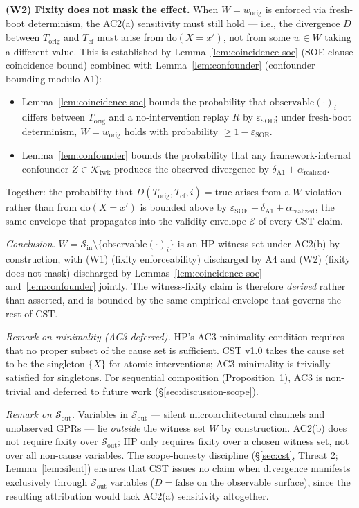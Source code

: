 \documentclass[conference]{IEEEtran}
\newcommand{\Korig}{T_\text{orig}}
\newcommand{\Tcf}{T_\text{cf}}
\newcommand{\Kfwk}{\mathcal{K}_\text{fwk}}
\newcommand{\arealized}{\alpha_\text{realized}}
\newcommand{\dox}[1]{\text{do}(X{=}#1)}
\newcommand{\epsSOE}{\varepsilon_\text{SOE}}
\begin{document}
\textbf{(W2) Fixity does not mask the effect.} When
$W = w_{\text{orig}}$ is enforced via fresh-boot determinism, the
AC2(a) sensitivity must still hold --- i.e., the divergence $D$
between $\Korig$ and $\Tcf$ must arise from $\dox{x'}$, not from
some $w \in W$ taking a different value. This is established by
Lemma~\ref{lem:coincidence-soe} (SOE-clause coincidence bound)
combined with Lemma~\ref{lem:confounder} (confounder bounding
modulo A1):
\begin{itemize}[leftmargin=*]
  \item Lemma~\ref{lem:coincidence-soe} bounds the probability
    that $\text{observable}(\cdot)_i$ differs between $\Korig$
    and a no-intervention replay $R$ by $\epsSOE$; under
    fresh-boot determinism, $W = w_{\text{orig}}$ holds with
    probability $\geq 1 - \epsSOE$.
  \item Lemma~\ref{lem:confounder} bounds the probability that
    any framework-internal confounder $Z \in \Kfwk$ produces the
    observed divergence by $\delta_{\text{A1}} + \arealized$.
\end{itemize}
Together: the probability that $D(\Korig, \Tcf, i) = \text{true}$
arises from a $W$-violation rather than from $\dox{x'}$ is bounded
above by $\epsSOE + \delta_{\text{A1}} + \arealized$, the same
envelope that propagates into the validity envelope $\mathcal{E}$
of every CST claim.

\emph{Conclusion.}
$W = \mathcal{S}_\text{in} \setminus \{\text{observable}(\cdot)_i\}$
is an HP witness set under AC2(b) by construction, with (W1)
(fixity enforceability) discharged by A4 and (W2)
(fixity does not mask) discharged by
Lemmas~\ref{lem:coincidence-soe} and~\ref{lem:confounder}
jointly. The witness-fixity claim is therefore \emph{derived}
rather than asserted, and is bounded by the same empirical
envelope that governs the rest of CST.

\emph{Remark on minimality (AC3 deferred).} HP's AC3 minimality
condition requires that no proper subset of the cause set is
sufficient. CST v1.0 takes the cause set to be the singleton
$\{X\}$ for atomic interventions; AC3 minimality is trivially
satisfied for singletons. For sequential composition
(Proposition~1), AC3 is non-trivial and deferred to future work
(\S\ref{sec:discussion-scope}).

\emph{Remark on $\mathcal{S}_\text{out}$.} Variables in
$\mathcal{S}_\text{out}$ --- silent microarchitectural channels
and unobserved GPRs --- lie \emph{outside} the witness set $W$
by construction. AC2(b) does not require fixity over
$\mathcal{S}_\text{out}$; HP only requires fixity over a chosen
witness set, not over all non-cause variables. The scope-honesty
discipline (\S\ref{sec:cst}, Threat 2; Lemma~\ref{lem:silent})
ensures that CST issues no claim when divergence manifests
exclusively through $\mathcal{S}_\text{out}$ variables
($D = \text{false}$ on the observable surface), since the
resulting attribution would lack AC2(a) sensitivity altogether.
\end{document}
